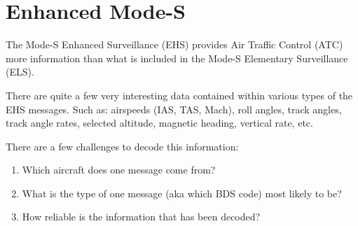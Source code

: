 \chapter{Enhanced Mode-S}

The Mode-S Enhanced Surveillance (EHS) provides Air Traffic Control (ATC) more information than what is included in the Mode-S Elementary Surveillance (ELS).

There are quite a few very interesting data contained within various types of the EHS messages. Such as: airspeeds (IAS, TAS, Mach), roll angles, track angles, track angle rates, selected altitude, magnetic heading, vertical rate, etc.

There are a few challenges to decode this information:
\begin{enumerate}
  \item Which aircraft does one message come from?
  \item What is the type of one message (aka which BDS code) most likely to be?
  \item How reliable is the information that has been decoded?
\end{enumerate}
